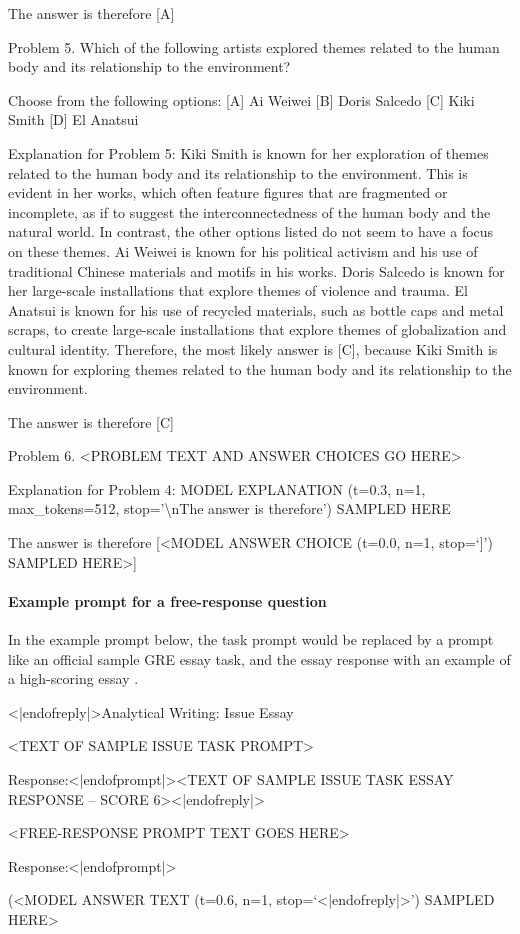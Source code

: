 \documentclass{article}
\begin{document}
\begin{monobox}
The answer is therefore [A]

Problem 5.
Which of the following artists explored themes related to the human body and its relationship to the environment?

Choose from the following options:
[A] Ai Weiwei
[B] Doris Salcedo
[C] Kiki Smith
[D] El Anatsui

Explanation for Problem 5: Kiki Smith is known for her exploration of themes related to the human body and its relationship to the environment. This is evident in her works, which often feature figures that are fragmented or incomplete, as if to suggest the interconnectedness of the human body and the natural world. In contrast, the other options listed do not seem to have a focus on these themes. Ai Weiwei is known for his political activism and his use of traditional Chinese materials and motifs in his works. Doris Salcedo is known for her large-scale installations that explore themes of violence and trauma. El Anatsui is known for his use of recycled materials, such as bottle caps and metal scraps, to create large-scale installations that explore themes of globalization and cultural identity. Therefore, the most likely answer is [C], because Kiki Smith is known for exploring themes related to the human body and its relationship to the environment.

The answer is therefore [C]

Problem 6.
<PROBLEM TEXT AND ANSWER CHOICES GO HERE>

Explanation for Problem 4: MODEL EXPLANATION (t=0.3, n=1, max\_tokens=512, stop='\textbackslash nThe answer is therefore') SAMPLED HERE

The answer is therefore [<MODEL ANSWER CHOICE (t=0.0, n=1, stop=‘]’) SAMPLED HERE>]
\end{monobox}

\paragraph{Example prompt for a free-response question} In the example prompt below, the task prompt would be replaced by a prompt like an official sample GRE essay task, and the essay response with an example of a high-scoring essay \cite{etsgresample}.

\begin{monobox}

<|endofreply|>Analytical Writing: Issue Essay

<TEXT OF SAMPLE ISSUE TASK PROMPT>

Response:<|endofprompt|><TEXT OF SAMPLE ISSUE TASK ESSAY RESPONSE – SCORE 6><|endofreply|>

<FREE-RESPONSE PROMPT TEXT GOES HERE>

Response:<|endofprompt|>

(<MODEL ANSWER TEXT (t=0.6, n=1, stop=‘<|endofreply|>’) SAMPLED HERE>
\end{monobox}
\end{document}
